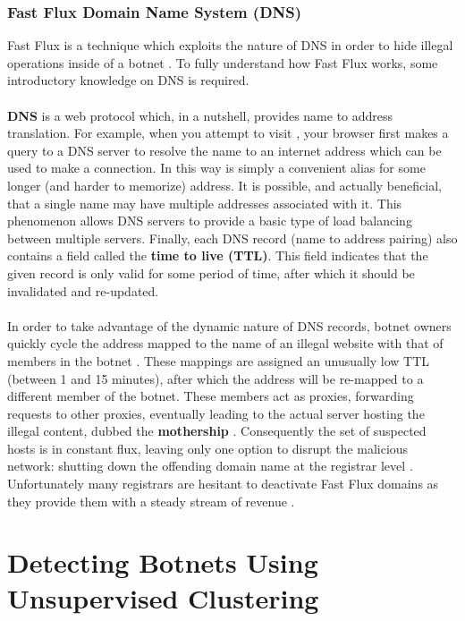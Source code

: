 \subsubsection{Fast Flux Domain Name System (DNS)}
Fast Flux is a technique which exploits the nature of DNS in order to hide illegal
operations inside of a botnet \cite{fastflux}. To fully understand how Fast Flux works,
some introductory knowledge on DNS is required.
\\ \\
\textbf{DNS} is a web protocol which, in a nutshell, provides name to address translation.
For example, when you attempt to visit , your browser first makes a query to
a DNS server to resolve the name  to an internet address which can
be used to make a connection.  In this way  is simply a convenient
alias for some longer (and harder to memorize) address. It is possible, and actually
beneficial, that a single name may have multiple addresses associated with it. This phenomenon
allows DNS servers to provide a basic type of load balancing between multiple servers.
Finally, each DNS record (name to address pairing) also contains a field called
the \textbf{time to live (TTL)}. This field indicates that the given record is only
valid for some period of time, after which it should be invalidated and re-updated.
\\ \\
In order to take advantage of the dynamic nature of DNS records, botnet owners
quickly cycle the address mapped to the name of an illegal website with that
of members in the botnet \cite{fastflux}. These mappings are assigned an unusually low TTL
(between 1 and 15 minutes), after which the address will be re-mapped to a
different member of the botnet.  These members act as proxies, forwarding requests to other proxies,
eventually leading to the actual server hosting the illegal content,
dubbed the \textbf{mothership} \cite{fastflux}. Consequently the set of suspected
hosts is in constant flux, leaving only one option to disrupt the malicious network:
shutting down the offending domain name at the registrar level \cite{fastflux}.
Unfortunately many registrars are hesitant to deactivate Fast Flux domains as they
provide them with a steady stream of revenue \cite{fastflux}.


\section{Detecting Botnets Using Unsupervised Clustering}
\label{detection}

